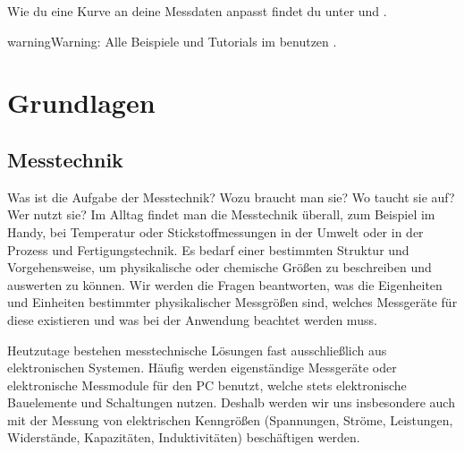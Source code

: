 \documentclass[letterpaper,10pt,english]{jupyterBook}
\begin{document}
\nopagebreak


\sphinxAtStartPar
Wie du eine Kurve an deine Messdaten anpasst findet du unter {\hyperref[\detokenize{content/1_Kurvenanpassung::doc}]{}} und {\hyperref[\detokenize{content/T_Tutorials::doc}]{}}.



\begin{sphinxadmonition}{warning}{Warning:}
\sphinxAtStartPar
Alle Beispiele und Tutorials im  benutzen .
\end{sphinxadmonition}

\sphinxstepscope


\part{Grundlagen}

\sphinxstepscope


\chapter{Messtechnik}
\label{\detokenize{content/1_Messtechnik:messtechnik}}\label{\detokenize{content/1_Messtechnik::doc}}
\sphinxAtStartPar
Was ist die Aufgabe der Messtechnik? Wozu braucht man sie? Wo taucht sie auf? Wer nutzt sie?
Im Alltag findet man die Messtechnik überall, zum Beispiel im Handy, bei Temperatur\sphinxhyphen{} oder Stickstoffmessungen in der Umwelt oder in der Prozess\sphinxhyphen{} und Fertigungstechnik. Es bedarf einer bestimmten Struktur und Vorgehensweise, um physikalische oder chemische Größen zu beschreiben und auswerten zu können.
Wir werden die Fragen beantworten, was die Eigenheiten und Einheiten bestimmter physikalischer Messgrößen sind, welches Messgeräte für diese existieren und was bei der Anwendung beachtet werden muss.

\sphinxAtStartPar
Heutzutage bestehen messtechnische Lösungen fast ausschließlich aus elektronischen Systemen. Häufig werden eigenständige Messgeräte oder elektronische Messmodule für den PC benutzt, welche stets elektronische Bauelemente und Schaltungen nutzen. Deshalb werden wir uns insbesondere auch mit der Messung von elektrischen Kenngrößen (Spannungen, Ströme, Leistungen, Widerstände, Kapazitäten, Induktivitäten) beschäftigen werden.
\end{document}
